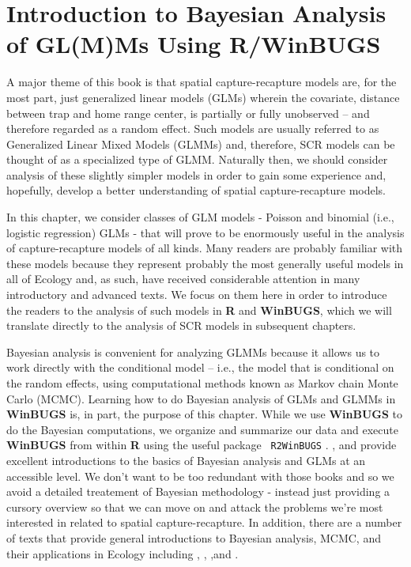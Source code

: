 \chapter{
Introduction to Bayesian Analysis of GL(M)Ms Using R/WinBUGS
}
\label{chapt.intro}

\vspace{.3in}



A major theme of this book is that spatial capture-recapture models
are, for the most part, just generalized linear models (GLMs) wherein
the covariate, distance between trap and home range center, is
partially or fully unobserved  -- and therefore regarded as 
a random effect. Such models
are usually referred to as Generalized Linear Mixed Models (GLMMs)
and, therefore, SCR models can be thought of as a specialized type of
GLMM. Naturally then, we should consider analysis of these slightly
simpler models in order to gain some experience and, hopefully,
develop a better understanding of spatial capture-recapture models.

In this chapter, we consider classes of GLM models - Poisson and
binomial (i.e., logistic regression) GLMs - that will prove to be
enormously useful in the analysis of capture-recapture models of all
kinds. Many readers are probably familiar with these models because
they represent probably 
the most generally useful models in all of Ecology and, as
such, have received considerable attention in many introductory and
advanced texts. We focus on them here in order to introduce the
readers to the analysis of such models in {\bf R} and {\bf WinBUGS}, 
which we will
translate directly to the analysis of SCR models in subsequent
chapters.  

Bayesian analysis is convenient for analyzing GLMMs because it allows
us to work directly with the conditional model -- i.e., the model that
is conditional on the random effects, using computational methods
known as Markov chain Monte Carlo (MCMC). Learning how to do Bayesian
analysis of GLMs and GLMMs in {\bf WinBUGS} is, in part, the purpose
of this chapter.  While we use {\bf WinBUGS} to do the Bayesian
computations, we organize and summarize our data and execute {\bf
  WinBUGS} from within {\bf R} using the useful package \mbox{\tt
  R2WinBUGS} \citep{sturtz_etal:2005}.  \citet{kery:2010}, and
\citet{kery_schaub:2011} provide excellent introductions to the basics
of Bayesian analysis and GLMs at an accessible level. We don't want to
be too redundant with those books and so we avoid a detailed
treatement of Bayesian methodology - instead just providing a cursory
overview so that we can move on and attack the problems we're most
interested in related to spatial capture-recapture.  In addition,
there are a number of texts that provide general introductions to
Bayesian analysis, MCMC, and their applications in Ecology including
\citet{mccarthy:2007}, \citet{kery:2010}, \citet{link_barker:2009},and
\citet{king_etal:2009}.



